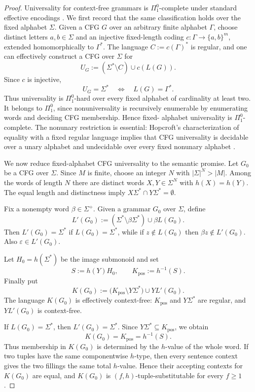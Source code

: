 \documentclass[11pt,a4paper]{article}
\theoremstyle{remark}
\newcommand{\eps}{\varepsilon}
\begin{document}
\begin{proof}
Universality for context-free grammars is \(\Pi^0_1\)-complete under
standard effective encodings \cite{DomaratzkiOkhotinShallit2007}.  We first
record that the same classification holds over the fixed alphabet \(\Sigma\).
Given a CFG \(G\) over an arbitrary finite alphabet \(\Gamma\), choose distinct
letters \(a,b\in\Sigma\) and an injective fixed-length coding
\(c:\Gamma\to\{a,b\}^m\), extended homomorphically to \(\Gamma^*\).  The
language \(C:=c(\Gamma)^*\) is regular, and one can effectively construct a CFG
over \(\Sigma\) for
\[
  U_G:=(\Sigma^*\setminus C)\cup c(L(G)).
\]
Since \(c\) is injective,
\[
  U_G=\Sigma^*
  \quad\Longleftrightarrow\quad
  L(G)=\Gamma^*.
\]
Thus universality is \(\Pi^0_1\)-hard over every fixed alphabet of cardinality
at least two.  It belongs to \(\Pi^0_1\), since nonuniversality is recursively
enumerable by enumerating words and deciding CFG membership.  Hence fixed-
alphabet universality is \(\Pi^0_1\)-complete.  The nonunary restriction is
essential: Hopcroft's characterization of equality with a fixed regular
language implies that CFG universality is decidable over a unary alphabet and
undecidable over every fixed nonunary alphabet \cite{Hopcroft1969}.

We now reduce fixed-alphabet CFG universality to the semantic promise.  Let
\(G_0\) be a CFG over \(\Sigma\).  Since \(M\) is finite, choose an integer
\(N\) with \(|\Sigma|^N>|M|\).  Among the words of
length \(N\) there are distinct words \(X,Y\in\Sigma^N\) with
\(h(X)=h(Y)\).  The equal length and distinctness imply
\(X\Sigma^*\cap Y\Sigma^*=\emptyset\).

Fix a nonempty word \(\beta\in\Sigma^+\).  Given a grammar \(G_0\) over
\(\Sigma\), define
\[
  L'(G_0):=(\Sigma^*\setminus \beta\Sigma^*)\cup \beta L(G_0).
\]
Then \(L'(G_0)=\Sigma^*\) if \(L(G_0)=\Sigma^*\), while if
\(z\notin L(G_0)\) then \(\beta z\notin L'(G_0)\).  Also
\(\eps\in L'(G_0)\).

Let \(H_0=h(\Sigma^*)\) be the image submonoid and set
\[
  S:=h(Y)H_0,
  \qquad K_{\mathrm{pos}}:=h^{-1}(S).
\]
Finally put
\[
  K(G_0):=\bigl(K_{\mathrm{pos}}\setminus Y\Sigma^*\bigr)\cup YL'(G_0).
\]
The language \(K(G_0)\) is effectively context-free: \(K_{\mathrm{pos}}\) and
\(Y\Sigma^*\) are regular, and \(YL'(G_0)\) is context-free.

If \(L(G_0)=\Sigma^*\), then \(L'(G_0)=\Sigma^*\).  Since
\(Y\Sigma^*\subseteq K_{\mathrm{pos}}\), we obtain
\[
  K(G_0)=K_{\mathrm{pos}}=h^{-1}(S).
\]
Thus membership in \(K(G_0)\) is determined by the \(h\)-value of the whole
word.  If two tuples have the same componentwise \(h\)-type, then every sentence
context gives the two fillings the same total \(h\)-value.  Hence their
accepting contexts for \(K(G_0)\) are equal, and \(K(G_0)\) is
\((f,h)\)-tuple-substitutable for every \(f\ge1\).


\end{proof}
\end{document}
